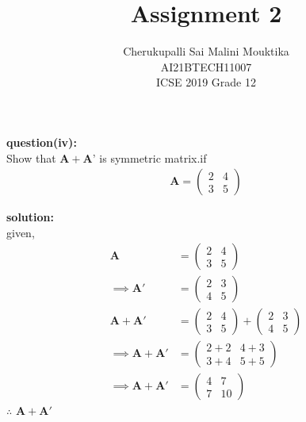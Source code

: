 \documentclass[12pt,two column]{article}
\title{Assignment 2}
\author{ Cherukupalli Sai Malini Mouktika\\\normalsize AI21BTECH11007 \\ \vspace*{10pt} \Large ICSE 2019 Grade 12}
\newcommand{\myvec}[1]{\ensuremath{\begin{pmatrix}#1\end{pmatrix}}}
\let\vec\mathbf
\begin{document}
\maketitle

\textbf{question(iv): }\\
Show that $\vec{A} + \vec{A’}$ is symmetric matrix.if
\begin{align}
     \vec{A} = \myvec{2 &  4 \\ 3 & 5}
\end{align}

 

\textbf{solution: }\\
given,
\begin{align}
\vec{A} &= \myvec{2 &  4 \\ 3 & 5}\\
\implies
\vec{A'} &=\myvec{2 &  3 \\ 4 & 5}\\
\vec{A}+\vec{A'} &= \myvec{2 &  4 \\ 3 & 5}+\myvec{2 &  3 \\ 4 & 5}\\
\implies
\vec{A}+\vec{A'} &= \myvec{2+2 &  4+3 \\ 3+4 & 5+5}\\
\implies
\vec{A}+\vec{A'} &= \myvec{4 &  7 \\ 7 & 10}
\end{align}
$\therefore$ $\vec{A}+\vec{A'}$ 
\end{document}
